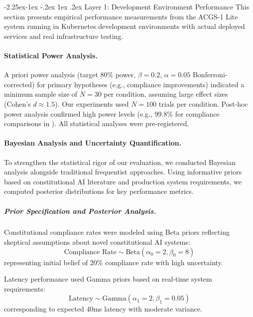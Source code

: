 \documentclass[manuscript,screen,9pt]{acmart}
\makeatletter
\renewcommand\subsection{\@startsection{subsection}{2}{\z@}%
  {-2.25ex\@plus -1ex \@minus -.2ex}%
  {1ex \@plus .2ex}%
  {\normalfont\large\bfseries}}
\makeatother
\begin{document}
\subsection{Layer 1: Development Environment Performance}
\label{subsec:development_performance}
This section presents empirical performance measurements from the ACGS-1 Lite system running in Kubernetes development environments with actual deployed services and real infrastructure testing.

\paragraph{Statistical Power Analysis.}
\label{subsec:power_analysis}
A priori power analysis (target 80\% power, $\beta = 0.2$, $\alpha = 0.05$ Bonferroni-corrected) for primary hypotheses (e.g., compliance improvements) indicated a minimum sample size of $N=30$ per condition, assuming large effect sizes (Cohen's $d \approx 1.5$). Our experiments used $N=100$ trials per condition. Post-hoc power analysis confirmed high power levels (e.g., 99.8\% for compliance comparisons in ). All statistical analyses were pre-registered.

\paragraph{Bayesian Analysis and Uncertainty Quantification.}
\label{subsec:bayesian_analysis}
To strengthen the statistical rigor of our evaluation, we conducted Bayesian analysis alongside traditional frequentist approaches. Using informative priors based on constitutional AI literature and production system requirements, we computed posterior distributions for key performance metrics.

\subparagraph{Prior Specification and Posterior Analysis.}
Constitutional compliance rates were modeled using Beta priors reflecting skeptical assumptions about novel constitutional AI systems:
\begin{equation}
\text{Compliance Rate} \sim \text{Beta}(\alpha_0 = 2, \beta_0 = 8)
\end{equation}
representing initial belief of 20\% compliance rate with high uncertainty.

Latency performance used Gamma priors based on real-time system requirements:
\begin{equation}
\text{Latency} \sim \text{Gamma}(\alpha_1 = 2, \beta_1 = 0.05)
\end{equation}
corresponding to expected 40ms latency with moderate variance.
\end{document}
